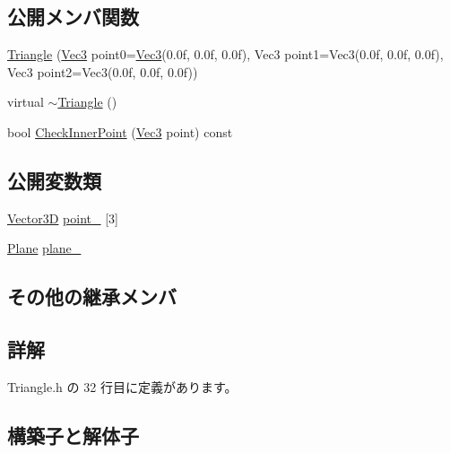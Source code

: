 \subsection*{公開メンバ関数}
\begin{DoxyCompactItemize}
\item 
\mbox{\hyperlink{class_triangle_a2d96bc16d87b0ece2fef7325d63969b3}{Triangle}} (\mbox{\hyperlink{_vector3_d_8h_ab16f59e4393f29a01ec8b9bbbabbe65d}{Vec3}} point0=\mbox{\hyperlink{_vector3_d_8h_ab16f59e4393f29a01ec8b9bbbabbe65d}{Vec3}}(0.\+0f, 0.\+0f, 0.\+0f), Vec3 point1=\+Vec3(0.\+0f, 0.\+0f, 0.\+0f), Vec3 point2=\+Vec3(0.\+0f, 0.\+0f, 0.\+0f))
\item 
virtual \mbox{\hyperlink{class_triangle_a5199760a17454f4dc94c855a57e3a152}{$\sim$\+Triangle}} ()
\item 
bool \mbox{\hyperlink{class_triangle_ac5d6a4c5f2bfda5cdc56c89a294fb46e}{Check\+Inner\+Point}} (\mbox{\hyperlink{_vector3_d_8h_ab16f59e4393f29a01ec8b9bbbabbe65d}{Vec3}} point) const
\end{DoxyCompactItemize}
\subsection*{公開変数類}
\begin{DoxyCompactItemize}
\item 
\mbox{\hyperlink{class_vector3_d}{Vector3D}} \mbox{\hyperlink{class_triangle_ab25f2be0ff148b58f1db904ad050353e}{point\+\_\+}} \mbox{[}3\mbox{]}
\item 
\mbox{\hyperlink{class_plane}{Plane}} \mbox{\hyperlink{class_triangle_a93586199c2c173771f2e167f477eaa70}{plane\+\_\+}}
\end{DoxyCompactItemize}
\subsection*{その他の継承メンバ}


\subsection{詳解}


 Triangle.\+h の 32 行目に定義があります。



\subsection{構築子と解体子}
\mbox{\label{class_triangle_a2d96bc16d87b0ece2fef7325d63969b3}} 
